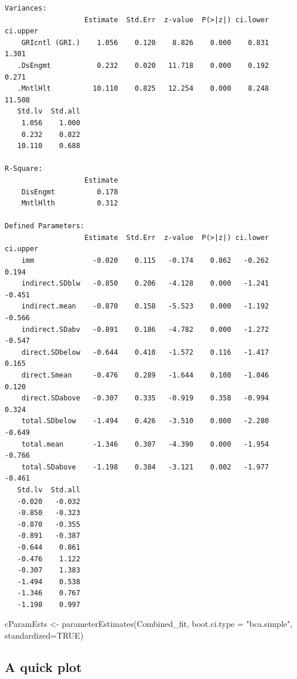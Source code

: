 \documentclass[
]{book}
\newenvironment{Shaded}{\begin{snugshade}}{\end{snugshade}}
\newcommand{\AttributeTok}[1]{\textcolor[rgb]{0.77,0.63,0.00}{#1}}
\newcommand{\ConstantTok}[1]{\textcolor[rgb]{0.00,0.00,0.00}{#1}}
\newcommand{\FunctionTok}[1]{\textcolor[rgb]{0.00,0.00,0.00}{#1}}
\newcommand{\NormalTok}[1]{#1}
\newcommand{\OtherTok}[1]{\textcolor[rgb]{0.56,0.35,0.01}{#1}}
\newcommand{\StringTok}[1]{\textcolor[rgb]{0.31,0.60,0.02}{#1}}
\begin{document}
\begin{verbatim}
Variances:
                   Estimate  Std.Err  z-value  P(>|z|) ci.lower ci.upper
    GRIcntl (GRI.)    1.056    0.120    8.826    0.000    0.831    1.301
   .DsEngmt           0.232    0.020   11.718    0.000    0.192    0.271
   .MntlHlt          10.110    0.825   12.254    0.000    8.248   11.508
   Std.lv  Std.all
    1.056    1.000
    0.232    0.822
   10.110    0.688

R-Square:
                   Estimate
    DisEngmt          0.178
    MntlHlth          0.312

Defined Parameters:
                   Estimate  Std.Err  z-value  P(>|z|) ci.lower ci.upper
    imm              -0.020    0.115   -0.174    0.862   -0.262    0.194
    indirect.SDblw   -0.850    0.206   -4.128    0.000   -1.241   -0.451
    indirect.mean    -0.870    0.158   -5.523    0.000   -1.192   -0.566
    indirect.SDabv   -0.891    0.186   -4.782    0.000   -1.272   -0.547
    direct.SDbelow   -0.644    0.410   -1.572    0.116   -1.417    0.165
    direct.Smean     -0.476    0.289   -1.644    0.100   -1.046    0.120
    direct.SDabove   -0.307    0.335   -0.919    0.358   -0.994    0.324
    total.SDbelow    -1.494    0.426   -3.510    0.000   -2.280   -0.649
    total.mean       -1.346    0.307   -4.390    0.000   -1.954   -0.766
    total.SDabove    -1.198    0.384   -3.121    0.002   -1.977   -0.461
   Std.lv  Std.all
   -0.020   -0.032
   -0.850   -0.323
   -0.870   -0.355
   -0.891   -0.387
   -0.644    0.861
   -0.476    1.122
   -0.307    1.383
   -1.494    0.538
   -1.346    0.767
   -1.198    0.997
\end{verbatim}

\begin{Shaded}
\begin{Highlighting}[]
\NormalTok{cParamEsts }\OtherTok{\textless{}{-}} \FunctionTok{parameterEstimates}\NormalTok{(Combined\_fit, }\AttributeTok{boot.ci.type =} \StringTok{"bca.simple"}\NormalTok{, }\AttributeTok{standardized=}\ConstantTok{TRUE}\NormalTok{)}
\end{Highlighting}
\end{Shaded}

\hypertarget{a-quick-plot}{%
\subsection{A quick plot}\label{a-quick-plot}}
\end{document}
